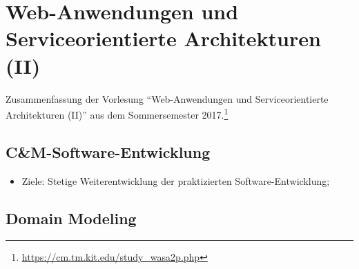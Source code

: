 \chapter{Web-Anwendungen und Serviceorientierte Architekturen (II)}

Zusammenfassung der Vorlesung "`Web-Anwendungen und Serviceorientierte Architekturen (II)"' aus dem Sommersemester 2017.\footnote{\url{https://cm.tm.kit.edu/study_wasa2p.php}}

\section{C\&M-Software-Entwicklung}
\begin{itemize}
	\item Ziele: Stetige Weiterentwicklung der praktizierten Software-Entwicklung; 
\end{itemize}



\section{Domain Modeling}

